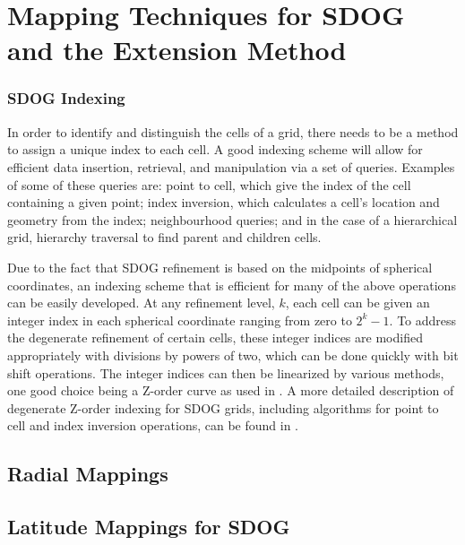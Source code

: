 \chapter{Mapping Techniques for SDOG and the Extension Method} \label{chap:mapping}





\subsection{SDOG Indexing} \label{sec:sdog-indexing}
In order to identify and distinguish the cells of a grid, there needs to be a method to assign a unique index to each cell.
A good indexing scheme will allow for efficient data insertion, retrieval, and manipulation via a set of queries.
Examples of some of these queries are: point to cell, which give the index of the cell containing a given point; index inversion, which calculates a cell's location and geometry from the index; neighbourhood queries; and in the case of a hierarchical grid, hierarchy traversal to find parent and children cells.


Due to the fact that SDOG refinement is based on the midpoints of spherical coordinates, an indexing scheme that is efficient for many of the above operations can be easily developed.
At any refinement level, $k$, each cell can be given an integer index in each spherical coordinate ranging from zero to $2^{k} - 1$.
To address the degenerate refinement of certain cells, these integer indices are modified appropriately with divisions by powers of two, which can be done quickly with bit shift operations.
The integer indices can then be linearized by various methods, one good choice being a Z-order curve \cite{morton1966computer} as used in \cite{yu2009sdog}.
A more detailed description of degenerate Z-order indexing for SDOG grids, including algorithms for point to cell and index inversion operations, can be found in \cite{yu2009coding}.


\section{Radial Mappings}
\section{Latitude Mappings for SDOG}

